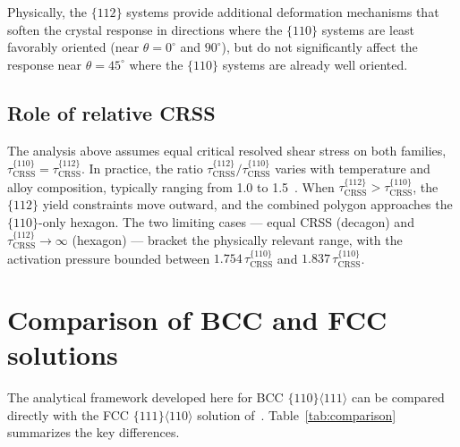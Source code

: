 \documentclass{svjour3} %
\newcommand{\tcrss}{\tau_{\mathrm{CRSS}}}
\begin{document}
Physically, the $\{112\}$ systems
provide additional deformation mechanisms that soften the crystal
response in directions where the $\{110\}$ systems are least favorably
oriented (near $\theta = 0^\circ$ and $90^\circ$), but do not
significantly affect the response near $\theta = 45^\circ$ where the
$\{110\}$ systems are already well oriented.

\subsection{Role of relative CRSS}

The analysis above assumes equal critical resolved shear stress on both
families, $\tcrss^{\{110\}} = \tcrss^{\{112\}}$. In practice, the
ratio $\tcrss^{\{112\}} / \tcrss^{\{110\}}$ varies with temperature
and alloy composition, typically ranging from 1.0 to
1.5~\citep{weinberger2013}. When
$\tcrss^{\{112\}} > \tcrss^{\{110\}}$, the $\{112\}$ yield constraints
move outward, and the combined polygon approaches the $\{110\}$-only
hexagon. The two limiting cases --- equal CRSS (decagon) and
$\tcrss^{\{112\}} \to \infty$ (hexagon) --- bracket the physically
relevant range, with the activation pressure bounded between
$1.754\,\tcrss^{\{110\}}$ and $1.837\,\tcrss^{\{110\}}$.

\section{Comparison of BCC and FCC solutions}
\label{sec:comparison}

The analytical framework developed here for BCC
$\{110\}\langle 111\rangle$ can be compared directly with the FCC
$\{111\}\langle 110\rangle$ solution of~\citet{kysar2005}.
Table~\ref{tab:comparison} summarizes the key differences.
\end{document}
